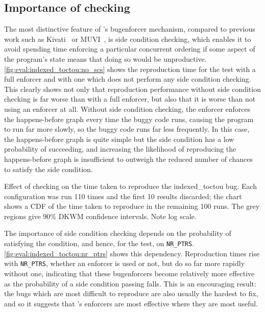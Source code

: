\subsection{Importance of  checking}

The most distinctive feature of {\technique}'s \gls{bugenforcer}
mechanism, compared to previous work such as Kivati~\cite{Chew2010} or
MUVI~\cite{Lu2007}, is \gls{side condition} checking, which enables it
to avoid spending time enforcing a particular concurrent ordering if
some aspect of the program's state means that doing so would be
unproductive.  \autoref{fig:eval:indexed_toctou:no_scs} shows the
reproduction time for the  test with a full enforcer
and with one which does not perform any \gls{side condition} checking.
This clearly shows not only that reproduction performance without
\gls{side condition} checking is far worse than with a full enforcer,
but also that it is worse than not using an enforcer at all.  Without
\gls{side condition} checking, the enforcer enforces the
happens-before graph every time the buggy code runs, causing the
program to run far more slowly, so the buggy code runs far less
frequently.  In this case, the happens-before graph is quite simple
but the \gls{side condition} has a low probability of succeeding, and
increasing the likelihood of reproducing the happens-before graph is
insufficient to outweigh the reduced number of chances to satisfy the
\gls{side condition}.

\begin{sanefig}
  \caption{Effect of  checking on the time taken to
    reproduce the indexed\_toctou bug.  Each configuration was run 110
    times and the first 10 results discarded; the chart shows a CDF of
    the time taken to reproduce in the remaining 100 runs.  The grey
    regions give 90\% DKWM confidence intervals.  Note log scale.}
  \label{fig:eval:indexed_toctou:no_scs}
\end{sanefig}

The importance of \gls{side condition} checking depends on the probability
of satisfying the condition, and hence, for the  test,
on \texttt{NR\_PTRS}.  \autoref{fig:eval:indexed_toctou:nr_ptrs} shows
this dependency.  Reproduction times rise with \texttt{NR\_PTRS},
whether an enforcer is used or not, but do so far more rapidly without
one, indicating that these \glspl{bugenforcer} become relatively more
effective as the probability of a \gls{side condition} passing falls.  This
is an encouraging result: the bugs which are most difficult to
reproduce are also usually the hardest to fix, and so it suggests that
{\technique}'s enforcers are most effective where they are most
useful.

